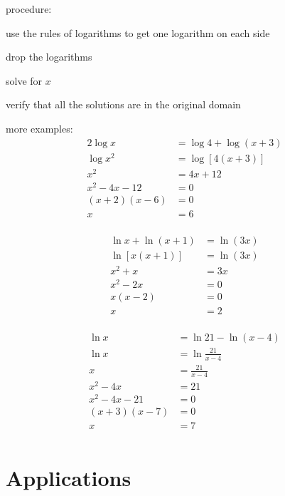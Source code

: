 \documentclass{exam}
\begin{document}
  procedure:
  \begin{itemize*}
    \item use the rules of logarithms to get one logarithm on each side
    \item drop the logarithms
    \item solve for $x$
    \item verify that all the solutions are in the original domain
  \end{itemize*}

  more examples:
  \begin{align*}
    2 \log x       &= \log 4 + \log(x + 3) \\
    \log x^2       &= \log [4(x + 3)] \\
    x^2            &= 4x + 12 \\
    x^2 - 4x - 12  &= 0 \\
    (x + 2)(x - 6) &= 0 \\
    x              &= 6 \\
  \end{align*}

  \begin{align*}
    \ln x + \ln(x + 1) &= \ln (3x) \\
    \ln [x(x + 1)]     &= \ln (3x) \\
    x^2 + x            &= 3x \\
    x^2 - 2x           &= 0 \\
    x(x - 2)           &= 0 \\
    x                  &= 2 \\
  \end{align*}

  \begin{align*}
    \ln x          &= \ln 21 - \ln(x - 4) \\
    \ln x          &= \ln \frac{21}{x - 4} \\
    x              &= \frac{21}{x - 4} \\
    x^2 - 4x       &= 21 \\
    x^2 - 4x - 21  &= 0 \\
    (x + 3)(x - 7) &= 0 \\
    x              &= 7 \\
  \end{align*}

  \section{Applications}
\end{document}
